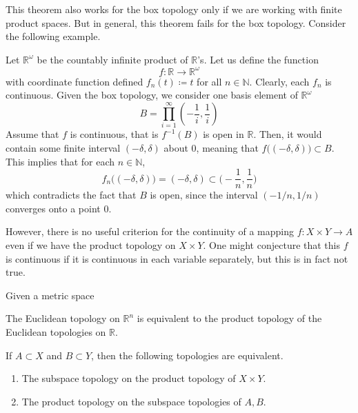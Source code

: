   This theorem also works for the box topology only if we are working with finite product spaces. But in general, this theorem fails for the box topology. Consider the following example. 

  \begin{example}
    Let $\mathbb{R}^\omega$ be the countably infinite product of $\mathbb{R}$'s. Let us define the function 
    \begin{equation}
      f: \mathbb{R} \rightarrow \mathbb{R}^\omega
    \end{equation}
    with coordinate function defined $f_n (t) \coloneqq t$ for all $n \in \mathbb{N}$. Clearly, each $f_n$ is continuous. Given the box topology, we consider one basis element of $\mathbb{R}^\omega$
    \begin{equation}
      B = \prod_{i=1}^\infty (-\frac{1}{i}, \frac{1}{i})
    \end{equation}
    Assume that $f$ is continuous, that is $f^{-1}(B)$ is open in $\mathbb{R}$. Then, it would contain some finite interval $(-\delta, \delta)$ about $0$, meaning that $f\big( (-\delta, \delta)\big) \subset B$. This implies that for each $n \in \mathbb{N}$, 
    \begin{equation}
      f_n \big( (-\delta, \delta) \big) = (-\delta, \delta) \subset \Big( -\frac{1}{n}, \frac{1}{n} \Big)
    \end{equation}
    which contradicts the fact that $B$ is open, since the interval $(-1/n, 1/n)$ converges onto a point $0$. 
  \end{example}

  However, there is no useful criterion for the continuity of a mapping $f: X \times Y \longrightarrow A$ even if we have the product topology on $X \times Y$. One might conjecture that this $f$ is continuous if it is continuous in each variable separately, but this is in fact not true. 

  \begin{theorem}
    Given a metric space
  \end{theorem}

  \begin{corollary}
    The Euclidean topology on $\mathbb{R}^n$ is equivalent to the product topology of the Euclidean topologies on $\mathbb{R}$. 
  \end{corollary} 

  \begin{theorem}
    If $A \subset X$ and $B \subset Y$, then the following topologies are equivalent. 
    \begin{enumerate}
      \item The subspace topology on the product topology of $X \times Y$. 
      \item The product topology on the subspace topologies of $A, B$. 
    \end{enumerate}
  \end{theorem}

